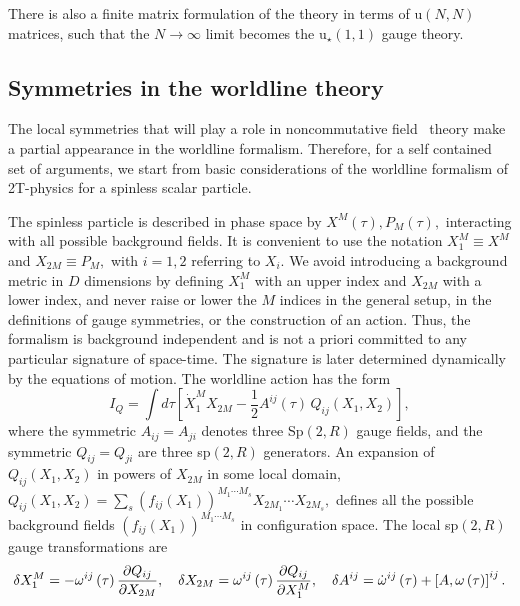 \documentclass[a4paper,12pt]{article}
\begin{document}
There is also a finite matrix formulation of the theory in terms of u$\left(
N,N\right) $ matrices, such that the $N\rightarrow \infty $ limit becomes
the u$_{\star }\left( 1,1\right) $ gauge theory.

\subsection{Symmetries in the worldline theory}

The local symmetries that will play a role in noncommutative field \ theory
make a partial appearance in the worldline formalism. Therefore, for a self
contained set of arguments, we start from basic considerations of the
worldline formalism of 2T-physics for a spinless scalar particle.

The spinless particle is described in phase space by $X^{M}\left( \tau
\right) ,P_{M}\left( \tau \right) ,$ interacting with all possible
background fields. It is convenient to use the notation $X_{1}^{M}\equiv
X^{M}$ and $X_{2M}\equiv P_{M},$ with $i=1,2$ referring to $X_{i}.$ We avoid
introducing a background metric in $D$ dimensions by defining $X_{1}^{M}$
with an upper index and $X_{2M}$ with a lower index, and never raise or
lower the $M$ indices in the general setup, in the definitions of gauge
symmetries, or the construction of an action. Thus, the formalism is
background independent and is not a priori committed to any particular
signature of space-time. The signature is later determined dynamically by
the equations of motion. The worldline action has the form \cite{emgrav}\cite
{highspin} 
\begin{equation}
I_{Q}=\int d\tau \left[ \dot{X}_{1}^{M}X_{2M}-{\frac{1}{2}}A^{ij}\left( \tau
\right) \,Q_{ij}(X_{1},X_{2})\right] ,  \label{worldline}
\end{equation}
where the symmetric $A_{ij}=A_{ji}$ denotes three Sp$\left( 2,R\right) $
gauge fields, and the symmetric $Q_{ij}=Q_{ji}$ are three sp$\left(
2,R\right) $ generators. An expansion of $Q_{ij}(X_{1},X_{2})$ in powers of $%
X_{2M}$ in some local domain, $Q_{ij}(X_{1},X_{2})=\sum_{s}\left(
f_{ij}\left( X_{1}\right) \right) ^{M_{1}\cdots M_{s}}X_{2M_{1}}\cdots
X_{2M_{s}},$ defines all the possible background fields $\left( f_{ij}\left(
X_{1}\right) \right) ^{M_{1}\cdots M_{s}}$ in configuration space. The local
sp$\left( 2,R\right) $ gauge transformations are 
\begin{equation}
\delta X_{1}^{M}=-\omega ^{ij}\left( \tau \right) \frac{\partial Q_{ij}}{%
\partial X_{2M}},\quad \delta X_{2M}=\omega ^{ij}\left( \tau \right) \frac{%
\partial Q_{ij}}{\partial X_{1}^{M}},\quad \delta A^{ij}=\dot{\omega}%
^{ij}\left( \tau \right) +\left[ A,\omega \left( \tau \right) \right] ^{ij}.
\end{equation}
\end{document}
